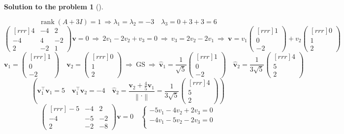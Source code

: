\documentclass[12pt,a4]{article}
\newtheorem{solution}{Solution to the problem}
\newcommand\rank{\operatorname{rank}}
\newcommand{\norm}[1]{\left\lVert#1\right\rVert}
\newcommand{\bv}{{\mathbf v}}
\begin{document}
{\begin{solution}[]
\begin{enumerate}[(a)]
\[\]
\[
\rank{(A + 3I)} = 1
~ \Rightarrow
\lambda_1 = \lambda_2 = -3
\quad
\lambda_3 = 0 + 3 + 3 = 6
\]
\[
\begin{pmatrix}[rrr]
4 & -4 & 2 \\
-4 & 4 & -2 \\
2 & -2 & 1
\end{pmatrix}
\bv = 0
~\Rightarrow~
2 v_1 - 2 v_2 + v_3 = 0
~\Rightarrow~
v_3 = 2 v_2 - 2 v_1
~\Rightarrow~
\bv = 
v_1
\begin{pmatrix}[rrr]
1 \\ 0 \\ - 2 
\end{pmatrix}
+
v_2
\begin{pmatrix}[rrr]
0 \\ 1 \\ 2 
\end{pmatrix}
\]
\[
\bv_1 =
\begin{pmatrix}[rrr]
1 \\ 0 \\ - 2 
\end{pmatrix}
\quad
\bv_2 =
\begin{pmatrix}[rrr]
0 \\ 1 \\ 2 
\end{pmatrix}
~\Rightarrow~\text{GS}~\Rightarrow~
\hat \bv_1 =
\frac1{\sqrt5}
\begin{pmatrix}[rrr]
1 \\ 0 \\ - 2 
\end{pmatrix}
\quad
\hat \bv_2 =
\frac1{3\sqrt5}
\begin{pmatrix}[rrr]
4 \\ 5 \\ 2 
\end{pmatrix}
\]
\[
\left (
\bv_1^\top \bv_1 = 5
\quad
\bv_1^\top \bv_2 = -4
\quad
\hat \bv_2 = \frac{\bv_2 + \frac45 \bv_1}{\norm{\cdot}} =
\frac1{3\sqrt5}
\begin{pmatrix}[rrr]
4 \\ 5 \\ 2 
\end{pmatrix}
\right )
\]
\[
\begin{pmatrix}[rrr]
-5 & -4 & 2 \\
-4 & -5 & -2 \\
2 & -2 & -8
\end{pmatrix}
\bv = 0
\quad
\left \{ \begin{matrix}
-5v_1-4v_2+2v_3 = 0 \\
-4v_1 -5v_2 -2v_3 = 0 \\

\end{matrix}\]
\end{enumerate}
\end{solution}}
\end{document}
